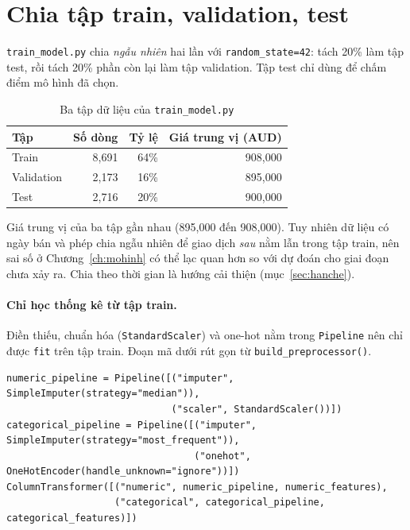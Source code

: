\section{Chia tập train, validation, test}\label{sec:chia}
\texttt{train\_model.py} chia \emph{ngẫu nhiên} hai lần với \texttt{random\_state=42}: tách 20\% làm tập test, rồi tách 20\% phần còn lại làm tập validation. Tập test chỉ dùng để chấm điểm mô hình đã chọn.

\begin{table}[H]
\centering
\caption{Ba tập dữ liệu của \texttt{train\_model.py}}\label{tab:chia}
\small
\begin{tabular}{@{}l r r r@{}}
\toprule
Tập & Số dòng & Tỷ lệ & Giá trung vị (AUD) \\
\midrule
Train & 8,691 & 64\% & 908,000 \\
Validation & 2,173 & 16\% & 895,000 \\
Test & 2,716 & 20\% & 900,000 \\
\bottomrule
\end{tabular}
\end{table}

Giá trung vị của ba tập gần nhau (895,000 đến 908,000). Tuy nhiên dữ liệu có ngày bán và phép chia ngẫu nhiên để giao dịch \emph{sau} nằm lẫn trong tập train, nên sai số ở Chương~\ref{ch:mohinh} có thể lạc quan hơn so với dự đoán cho giai đoạn chưa xảy ra. Chia theo thời gian là hướng cải thiện (mục~\ref{sec:hanche}).

\paragraph{Chỉ học thống kê từ tập train.} Điền thiếu, chuẩn hóa (\texttt{StandardScaler}) và one-hot nằm trong \texttt{Pipeline} nên chỉ được \texttt{fit} trên tập train. Đoạn mã dưới rút gọn từ \texttt{build\_preprocessor()}.

\begin{lstlisting}
numeric_pipeline = Pipeline([("imputer", SimpleImputer(strategy="median")),
                             ("scaler", StandardScaler())])
categorical_pipeline = Pipeline([("imputer", SimpleImputer(strategy="most_frequent")),
                                 ("onehot", OneHotEncoder(handle_unknown="ignore"))])
ColumnTransformer([("numeric", numeric_pipeline, numeric_features),
                   ("categorical", categorical_pipeline, categorical_features)])
\end{lstlisting}

